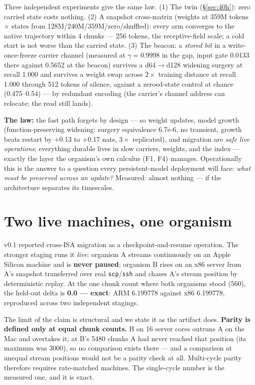 \documentclass[11pt]{article}
\theoremstyle{definition}
\newcommand{\code}[1]{\texttt{#1}}
\begin{document}
Three independent experiments give the same law. (1) The twin
(\S\ref{sec:40h}): zero carried state costs nothing. (2) A snapshot
cross-matrix (weights at 359M tokens $\times$ states from
128M/240M/359M/zero/shuffled): every arm converges to the native trajectory
within 4 chunks --- 256 tokens, the receptive-field scale; a cold start is
not worse than the carried state. (3) The beacon: a \emph{stored bit} in a
write-once-freeze carrier channel (measured at $\gamma = 0.9998$ in the gap,
input gate 0.0133 there against 0.5652 at the beacon) survives a
d64$\to$d128 widening surgery at recall 1.000 and survives a weight swap
across $2\times$ training distance at recall 1.000 through 512 tokens of
silence, against a zeroed-state control at chance (0.475--0.54) --- by
redundant encoding (the carrier's channel address can relocate; the read
still lands).

\textbf{The law:} the fast path forgets by design --- so weight updates,
model growth (function-preserving widening: surgery equivalence 6.7e-6, no
transient, growth beats restart by +0.13 to +0.17 nats, $3\times$
replicated), and migration are \emph{safe live operations}; everything
durable lives in slow carriers, weights, and the index --- exactly the
layer the organism's own calculus (F1, F4) manages. Operationally this is
the answer to a question every persistent-model deployment will face:
\emph{what must be preserved across an update?} Measured: almost nothing ---
if the architecture separates its timescales.

\section{Two live machines, one organism}
\label{sec:moebius}

v0.1 reported cross-ISA migration as a checkpoint-and-resume operation. The
stronger staging runs it \emph{live}: organism A streams continuously on an
Apple Silicon machine and is \textbf{never paused}; organism B rises on an
x86 server from A's snapshot transferred over real \code{scp}/\code{ssh} and
chases A's stream position by deterministic replay. At the one chunk count
where both organisms stood (560), the held-out delta is \textbf{0.0 ---
exact}: ARM 6.199778 against x86 6.199778, reproduced across two independent
stagings.

The limit of the claim is structural and we state it as the artifact does.
\textbf{Parity is defined only at equal chunk counts.} B on 16 server cores
outruns A on the Mac and overtakes it; at B's 5480 chunks A had never
reached that position (its maximum was 3000), so no comparison exists there
--- and a comparison at unequal stream positions would not be a parity check
at all. Multi-cycle parity therefore requires rate-matched machines. The
single-cycle number is the measured one, and it is exact.
\end{document}
